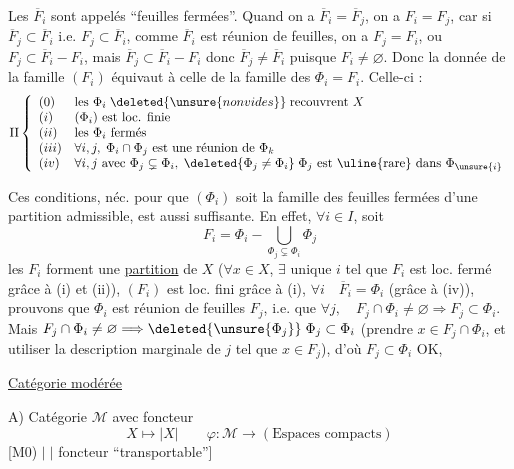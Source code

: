 Les $\overline F_i$ sont appelés ``feuilles fermées''. Quand on a $\overline F_i=\overline F_j$, on a $F_i=F_j$, car si $\overline F_j\subset\overline F_i$ i.e. $F_j\subset\overline F_i$, comme $\overline F_i$ est réunion de feuilles, on a $F_j=F_i$, ou $F_j\subset\overline F_i-F_i$, mais   $\overline F_j\subset\overline F_i-F_i$ donc $\overline F_j\neq\overline F_i$ puisque $F_i\neq\varnothing$. Donc la donnée de la famille $(F_i)$ équivaut à celle de la famille des $\Phi_i=F_i$. Celle-ci  :
\[
\mathrm{II}\left\{\begin{array}{ll}
(0)&\text{les }\Phi_i\;\deleted{\unsure{non vides}}\;\text{recouvrent }X\\
(i)&(\Phi_i)\text{ est loc. finie}\\
(ii)&\text{les }\Phi_i\text{ fermés}\\
(iii)&\forall i,j,\;\Phi_i\cap\Phi_j\text{ est une réunion de }\Phi_k\\
(iv)&\forall i,j\text{ avec }\Phi_j\subsetneq\Phi_i,\;
\deleted{\Phi_j\neq\Phi_i}\;\Phi_j\text{ est \uline{rare} dans }\Phi_{\unsure{i}}
\end{array}\right.
\]

Ces conditions, néc. pour que $(\Phi_i)$ soit la famille des feuilles fermées d'une partition admissible, est aussi suffisante. En effet, $\forall i\in I$, soit 
\[
F_i=\Phi_i-\bigcup_{\Phi_j\subsetneq\Phi_i}\Phi_j
\]
les $F_i$ forment une \uline{partition} de $X$ ($\forall x\in X$, $\exists$ unique $i$ tel que
$F_i$ est loc. fermé grâce à (i) et (ii)), $(F_i)$ est loc. fini grâce à (i),  $\forall i\quad\overline F_i=\Phi_i$ (grâce à (iv)),
prouvons que $\Phi_i$ est réunion de feuilles $F_j$, i.e.
que $\forall j,\quad F_j\cap\Phi_i\neq\varnothing\Rightarrow F_j\subset\Phi_i$.
Mais $F_j\cap\Phi_i\neq\varnothing\Longrightarrow\deleted{\unsure{\Phi_j}}\;\Phi_j\subset\Phi_i$ (prendre $x\in F_j\cap\Phi_i$, et utiliser la description marginale de $j$ tel que $x\in F_j$), d'où $F_j\subset\Phi_i$ OK,


\uline{Catégorie modérée}

A) Catégorie $\mathcal M$ avec foncteur
\[
X\longmapsto|X|\qquad
\varphi:\mathcal M\longrightarrow(\text{Espaces compacts})
\]
[M0) $|\;|$ foncteur ``transportable'']

